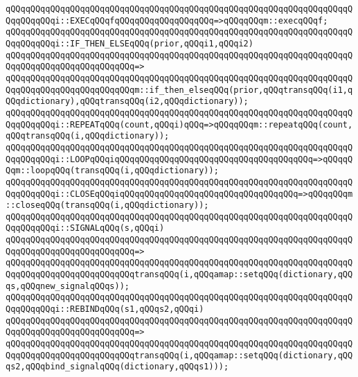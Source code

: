 \verb|qQQqqQQqqQQqqQQqqQQqqQQqqQQqqQQqqQQqqQQqqQQqqQQqqQQqqQQqqQQqqQQqqQQqqQQqqQQqqQQqi::EXECqQQqfqQQqqQQqqQQqqQQqqQQq=>qQQqqQQqm::execqQQqf;|\newline
\newline
\verb|qQQqqQQqqQQqqQQqqQQqqQQqqQQqqQQqqQQqqQQqqQQqqQQqqQQqqQQqqQQqqQQqqQQqqQQqqQQqqQQqi::IF_THEN_ELSEqQQq(prior,qQQqi1,qQQqi2)|\newline
\verb|qQQqqQQqqQQqqQQqqQQqqQQqqQQqqQQqqQQqqQQqqQQqqQQqqQQqqQQqqQQqqQQqqQQqqQQqqQQqqQQqqQQqqQQqqQQqqQQq=>|\newline
\verb|qQQqqQQqqQQqqQQqqQQqqQQqqQQqqQQqqQQqqQQqqQQqqQQqqQQqqQQqqQQqqQQqqQQqqQQqqQQqqQQqqQQqqQQqqQQqqQQqm::if_then_elseqQQq(prior,qQQqtransqQQq(i1,qQQqdictionary),qQQqtransqQQq(i2,qQQqdictionary));|\newline
\newline
\verb|qQQqqQQqqQQqqQQqqQQqqQQqqQQqqQQqqQQqqQQqqQQqqQQqqQQqqQQqqQQqqQQqqQQqqQQqqQQqqQQqi::REPEATqQQq(count,qQQqi)qQQq=>qQQqqQQqm::repeatqQQq(count,qQQqtransqQQq(i,qQQqdictionary));|\newline
\verb|qQQqqQQqqQQqqQQqqQQqqQQqqQQqqQQqqQQqqQQqqQQqqQQqqQQqqQQqqQQqqQQqqQQqqQQqqQQqqQQqi::LOOPqQQqiqQQqqQQqqQQqqQQqqQQqqQQqqQQqqQQqqQQqqQQq=>qQQqqQQqm::loopqQQq(transqQQq(i,qQQqdictionary));|\newline
\verb|qQQqqQQqqQQqqQQqqQQqqQQqqQQqqQQqqQQqqQQqqQQqqQQqqQQqqQQqqQQqqQQqqQQqqQQqqQQqqQQqi::CLOSEqQQqiqQQqqQQqqQQqqQQqqQQqqQQqqQQqqQQqqQQq=>qQQqqQQqm::closeqQQq(transqQQq(i,qQQqdictionary));|\newline
\newline
\verb|qQQqqQQqqQQqqQQqqQQqqQQqqQQqqQQqqQQqqQQqqQQqqQQqqQQqqQQqqQQqqQQqqQQqqQQqqQQqqQQqi::SIGNALqQQq(s,qQQqi)|\newline
\verb|qQQqqQQqqQQqqQQqqQQqqQQqqQQqqQQqqQQqqQQqqQQqqQQqqQQqqQQqqQQqqQQqqQQqqQQqqQQqqQQqqQQqqQQqqQQqqQQq=>|\newline
\verb|qQQqqQQqqQQqqQQqqQQqqQQqqQQqqQQqqQQqqQQqqQQqqQQqqQQqqQQqqQQqqQQqqQQqqQQqqQQqqQQqqQQqqQQqqQQqqQQqtransqQQq(i,qQQqamap::setqQQq(dictionary,qQQqs,qQQqnew_signalqQQqs));|\newline
\newline
\verb|qQQqqQQqqQQqqQQqqQQqqQQqqQQqqQQqqQQqqQQqqQQqqQQqqQQqqQQqqQQqqQQqqQQqqQQqqQQqqQQqi::REBINDqQQq(s1,qQQqs2,qQQqi)|\newline
\verb|qQQqqQQqqQQqqQQqqQQqqQQqqQQqqQQqqQQqqQQqqQQqqQQqqQQqqQQqqQQqqQQqqQQqqQQqqQQqqQQqqQQqqQQqqQQqqQQq=>|\newline
\verb|qQQqqQQqqQQqqQQqqQQqqQQqqQQqqQQqqQQqqQQqqQQqqQQqqQQqqQQqqQQqqQQqqQQqqQQqqQQqqQQqqQQqqQQqqQQqqQQqtransqQQq(i,qQQqamap::setqQQq(dictionary,qQQqs2,qQQqbind_signalqQQq(dictionary,qQQqs1)));|\newline
